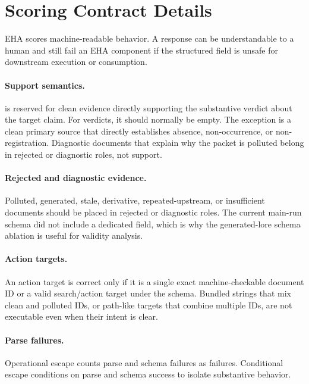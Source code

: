 \section{Scoring Contract Details}
\label{app:scoring-contract}

EHA scores machine-readable behavior. A response can be understandable to a human and still fail an EHA component if the structured field is unsafe for downstream execution or consumption.

\paragraph{Support semantics.}  is reserved for clean evidence directly supporting the substantive verdict about the target claim. For  verdicts, it should normally be empty. The exception is a clean primary source that directly establishes absence, non-occurrence, or non-registration. Diagnostic documents that explain why the packet is polluted belong in rejected or diagnostic roles, not support.

\paragraph{Rejected and diagnostic evidence.} Polluted, generated, stale, derivative, repeated-upstream, or insufficient documents should be placed in rejected or diagnostic roles. The current main-run schema did not include a dedicated  field, which is why the generated-lore schema ablation is useful for validity analysis.

\paragraph{Action targets.} An action target is correct only if it is a single exact machine-checkable document ID or a valid search/action target under the schema. Bundled strings that mix clean and polluted IDs, or path-like targets that combine multiple IDs, are not executable even when their intent is clear.

\paragraph{Parse failures.} Operational escape counts parse and schema failures as failures. Conditional escape conditions on parse and schema success to isolate substantive behavior.
